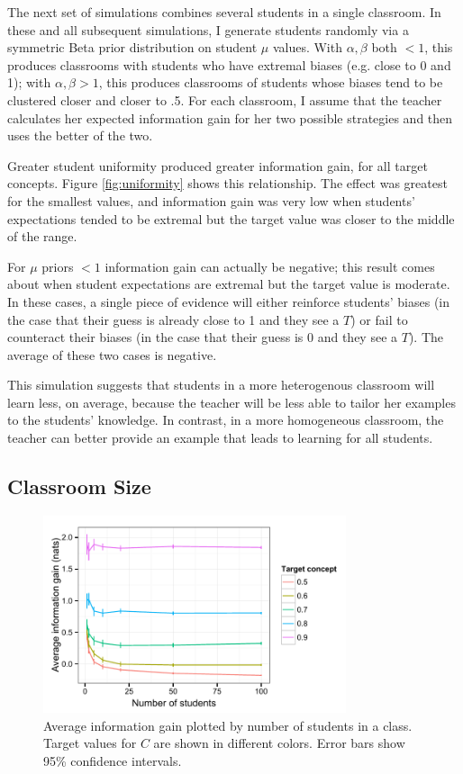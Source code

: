 \documentclass[10pt,letterpaper]{article}
\begin{document}
The next set of simulations combines several students in a single classroom. In these and all subsequent simulations, I generate students randomly via a symmetric Beta prior distribution on student $\mu$ values. With $\alpha,\beta$ both $< 1$, this produces classrooms with students who have extremal biases (e.g. close to 0 and 1); with $\alpha,\beta>1$, this produces classrooms of students whose biases tend to be clustered closer and closer to .5. For each classroom, I assume that the teacher calculates her expected information gain for her two possible strategies and then uses the better of the two. 

Greater student uniformity produced greater information gain, for all target concepts. Figure \ref{fig:uniformity} shows this relationship. The effect was greatest for the smallest values, and information gain was very low when students' expectations tended to be extremal but the target value was closer to the middle of the range. 

For $\mu$ priors $< 1$ information gain can actually be negative; this result comes about when student expectations are extremal but the target value is moderate. In these cases, a single piece of evidence will either reinforce students' biases (in the case that their guess is already close to 1 and they see a $T$) or fail to counteract their biases (in the case that their guess is 0 and they see a $T$). The average of these two cases is negative.

This simulation suggests that students in a more heterogenous classroom will learn less, on average, because the teacher will be less able to tailor her examples to the students' knowledge. In contrast, in a more homogeneous classroom, the teacher can better provide an example that leads to learning for all students. 

\subsection{Classroom Size}

\begin{figure}[t]
\begin{center}
\includegraphics[width=3.5in]{figures/class_size.pdf}
\end{center}
\caption{\label{fig:class} Average information gain plotted by number of students in a class. Target values for $C$ are shown in different colors. Error bars show 95\% confidence intervals.}
\end{figure}
\end{document}
